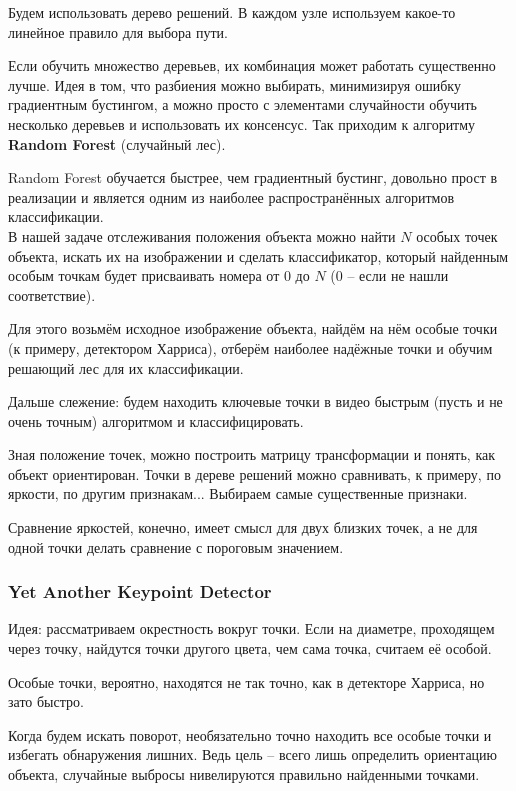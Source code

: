 \documentclass[main.tex]{subfiles}
\begin{document}
Будем использовать дерево решений.
В каждом узле используем какое-то линейное правило для выбора пути.

Если обучить множество деревьев, их комбинация может работать существенно лучше.
Идея в том, что разбиения можно выбирать, минимизируя ошибку градиентным бустингом, а можно просто с элементами случайности обучить несколько деревьев и использовать их консенсус. Так приходим к алгоритму \textbf{Random Forest} (случайный лес).

Random Forest обучается быстрее, чем градиентный бустинг, довольно прост в реализации и является одним из наиболее распространённых алгоритмов классификации. \\

В нашей задаче отслеживания положения объекта можно найти $ N $ особых точек объекта, искать их на изображении и сделать классификатор, который найденным особым точкам будет присваивать номера от $ 0 $ до $ N $ (0 -- если не нашли соответствие).

Для этого возьмём исходное изображение объекта, найдём на нём особые точки (к примеру, детектором Харриса), отберём наиболее надёжные точки и обучим решающий лес для их классификации.

Дальше слежение: будем находить ключевые точки в видео быстрым (пусть и не очень точным) алгоритмом и классифицировать.

Зная положение точек, можно построить матрицу трансформации и понять, как объект ориентирован.
Точки в дереве решений можно сравнивать, к примеру, по яркости, по другим признакам...
Выбираем самые существенные признаки.

Сравнение яркостей, конечно, имеет смысл для двух близких точек, а не для одной точки делать сравнение с пороговым значением.

\subsubsection{Yet Another Keypoint Detector}

Идея: рассматриваем окрестность вокруг точки.
Если на диаметре, проходящем через точку, найдутся точки другого цвета, чем сама точка, считаем её особой.

Особые точки, вероятно, находятся не так точно, как в детекторе Харриса, но зато быстро.

Когда будем искать поворот, необязательно точно находить все особые точки и избегать обнаружения лишних.
Ведь цель -- всего лишь определить ориентацию объекта, случайные выбросы нивелируются правильно найденными точками.
\end{document}
